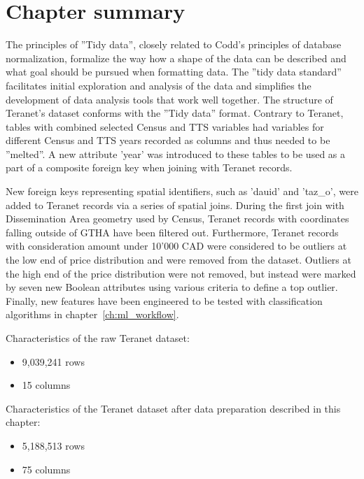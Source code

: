 \section{Chapter summary} \label{sec:data_preparation_summary}

The principles of ''Tidy data'', closely related to Codd's principles of database normalization, formalize the way how a shape of the data can be described and what goal should be pursued when formatting data.
The ''tidy data standard''  facilitates initial exploration and analysis of the data and simplifies the development of data analysis tools that work well together.
The structure of Teranet's dataset conforms with the ''Tidy data'' format.
Contrary to Teranet, tables with combined selected Census and TTS variables had variables for different Census and TTS years recorded as columns and thus needed to be ''melted''.
A new attribute 'year' was introduced to these tables to be used as a part of a composite foreign key when joining with Teranet records.

New foreign keys representing spatial identifiers, such as 'dauid' and 'taz\_o', were added to Teranet records via a series of spatial joins.
During the first join with Dissemination Area geometry used by Census, Teranet records with coordinates falling outside of GTHA have been filtered out.
Furthermore, Teranet records with consideration amount under 10'000 CAD were considered to be outliers at the low end of price distribution and were removed from the dataset.
Outliers at the high end of the price distribution were not removed, but instead were marked by seven new Boolean attributes using various criteria to define a top outlier.
Finally, new features have been engineered to be tested with classification algorithms in chapter~\ref{ch:ml_workflow}.

\vspace{5mm}

Characteristics of the raw Teranet dataset:
\begin{itemize}
    \item 9,039,241 rows
    \item 15 columns
\end{itemize}

Characteristics of the Teranet dataset after data preparation described in this chapter:
\begin{itemize}
    \item 5,188,513 rows
    \item 75 columns
\end{itemize}
